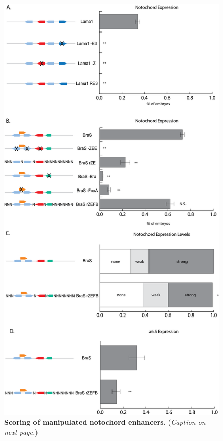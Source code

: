 \begin{figure}[p]
    \centering
    \includegraphics[scale=.5]{2_figures/FigS5_Notochord-Counting.png}
    \caption[Scoring of manipulated notochord enhancers]{\textbf{Scoring of manipulated notochord enhancers.} (\textit{Caption on next page.})}
    \label{fig:supplement manipulated enhancers}
\end{figure}
